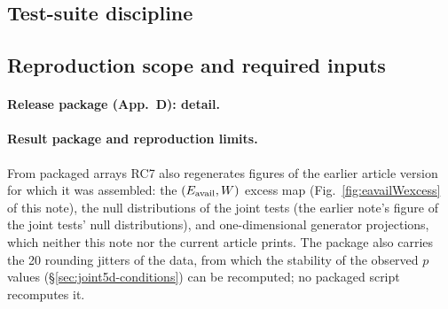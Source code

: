 

\subsection{Test-suite discipline}\label{recsec:repro-tests}


\subsection{Reproduction scope and required inputs}\label{recsec:repro-scope}

\paragraph{Release package (App.~D): detail.}

\paragraph{Result package and reproduction limits.} From packaged arrays RC7 also regenerates figures of the earlier article version for which it was assembled: the $(E_{\mathrm{avail}},W)$ excess map (Fig.~\ref{fig:eavailWexcess} of this note), the null distributions of the joint tests (the earlier note's figure of the joint tests' null distributions), and one-dimensional generator projections, which neither this note nor the current article prints. The package also carries the 20 rounding jitters of the data, from which the stability of the observed $p$ values (\S\ref{sec:joint5d-conditions}) can be recomputed; no packaged script recomputes it.

